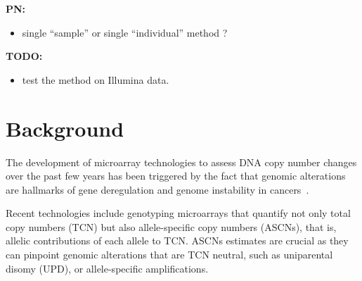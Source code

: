 \documentclass[10pt]{bmc_article}
\newenvironment{bmcformat}{\fussy\setboolean{publ}{true}}{\fussy}
\newenvironment{TODO}{\color{red}\textbf{TODO:}}{}
\newenvironment{PN}{\color{blue}\textbf{PN:}}{}
\begin{document}
\begin{bmcformat}

  \begin{PN}
    \begin{itemize}
    \item single ``sample'' or single ``individual'' method ?
 \end{itemize}

  \end{PN}

  \begin{TODO}
    \begin{itemize}
    \item test the method on Illumina data.
    \end{itemize}
  \end{TODO}


\section*{Background}
\label{secBackground}

The development of microarray technologies to assess DNA copy number changes over the past few years has been triggered by the fact that genomic alterations are hallmarks of gene deregulation and genome instability in cancers~\cite{albertson03chromosome,hanahan00the-hallmarks}. 

Recent technologies include genotyping microarrays that quantify not only total copy numbers (TCN) but also allele-specific copy numbers (ASCNs), that is, allelic contributions of each allele to TCN. ASCNs estimates are crucial as they can pinpoint genomic alterations that are TCN neutral, such as uniparental disomy (UPD), or allele-specific amplifications.


\end{bmcformat}
\end{document}
